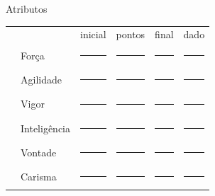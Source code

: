 \documentclass[a4paper,12pt]{article}
\begin{document}
	\begin{minipage}[t][][t]{.49\linewidth}
		{\centering Atributos \\}
		\vspace{.3cm}
		
		\begin{tabularx}{\textwidth}{ p{.01\linewidth} l X X X X }
			& & inicial & pontos & final & dado \\
			\Mars & Força & \rule{\linewidth}{.5pt}  & \rule{\linewidth}{.5pt}  & \rule{\linewidth}{.5pt} & \rule{\linewidth}{.5pt} \\
			\Mercury & Agilidade  & \rule{\linewidth}{.5pt}  & \rule{\linewidth}{.5pt}  & \rule{\linewidth}{.5pt} & \rule{\linewidth}{.5pt} \\
			\Jupiter & Vigor  & \rule{\linewidth}{.5pt}  & \rule{\linewidth}{.5pt}  & \rule{\linewidth}{.5pt} & \rule{\linewidth}{.5pt} \\
			\Moon & Inteligência  & \rule{\linewidth}{.5pt}  & \rule{\linewidth}{.5pt}  & \rule{\linewidth}{.5pt} & \rule{\linewidth}{.5pt} \\
			\Sun & Vontade  & \rule{\linewidth}{.5pt}  & \rule{\linewidth}{.5pt}  & \rule{\linewidth}{.5pt} & \rule{\linewidth}{.5pt} \\
			\Venus & Carisma  & \rule{\linewidth}{.5pt}  & \rule{\linewidth}{.5pt}  & \rule{\linewidth}{.5pt} & \rule{\linewidth}{.5pt} \\
		\end{tabularx}
	\end{minipage}%
	\hspace{.02\linewidth}%
\end{document}
